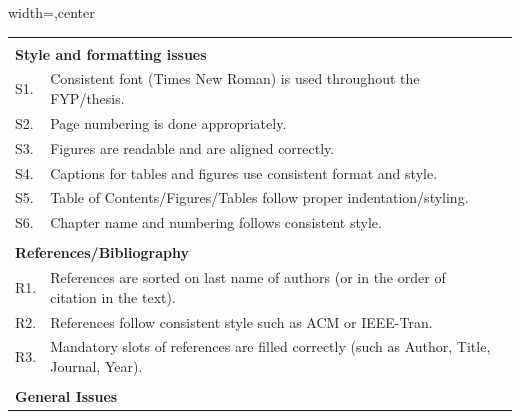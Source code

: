 \begin{table}[!ht]
\begin{adjustbox}{width=\linewidth,center}
\begin{tabular}{p{0.6cm}p{9cm}p{0.6cm}}
               &                                                                                                                 &  \\
\multicolumn{2}{l}{\textbf{Style and formatting issues}}                                                                         &  \\
S1.            & Consistent font (Times New Roman) is   used throughout the FYP/thesis.                                              &  \\
S2.            & Page numbering is   done appropriately.                                                                         &  \\
S3.            & Figures are readable   and are aligned correctly.                                                               &  \\
S4.            & Captions for tables   and figures use consistent format and style.                                              &  \\
S5.            & Table of   Contents/Figures/Tables follow proper indentation/styling.                                           &  \\
S6.            & Chapter name and   numbering follows consistent style.                                                          &  \\
               &                                                                                                                 &  \\
\multicolumn{2}{l}{\textbf{References/Bibliography}}                                                                             &  \\
R1.            & References are   sorted on last name of authors (or in the order of citation in the text).                      &  \\
R2.            & References follow   consistent style such as ACM or IEEE-Tran.                                                  &  \\
R3.            & Mandatory slots of   references are filled correctly (such as Author, Title, Journal, Year).                    &  \\
               &                                                                                                                 &  \\
\multicolumn{2}{l}{\textbf{General Issues}}                                                                                      &  \\

\end{tabular}
\end{adjustbox}
\end{table}
